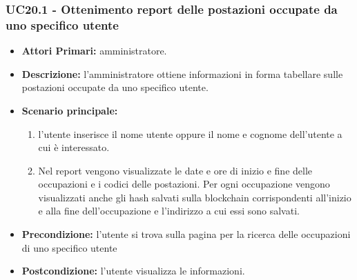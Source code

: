\subsubsection{ UC20.1 - Ottenimento report delle postazioni occupate da uno specifico utente}
\begin{itemize}
           	\item\textbf{Attori Primari:} 
           	amministratore.
           	\item\textbf{Descrizione:} 
           	l'amministratore ottiene informazioni in forma tabellare sulle postazioni occupate da uno specifico utente.
           	\item\textbf{Scenario principale:} 
           	\begin{enumerate}
           		\item l'utente inserisce il nome utente oppure il nome e cognome dell'utente a cui è interessato.
           		\item Nel report vengono visualizzate le date e ore di inizio e fine delle occupazioni e i codici delle postazioni.
           		Per ogni occupazione vengono visualizzati anche gli hash salvati sulla blockchain corrispondenti all'inizio e alla fine dell'occupazione e l'indirizzo a cui essi sono salvati.
           	\end{enumerate}
           	\item\textbf{Precondizione:} 
           	l'utente si trova sulla pagina per la ricerca delle occupazioni di uno specifico utente
           	\item\textbf{Postcondizione:}
           	l'utente visualizza le informazioni.
\end{itemize}

